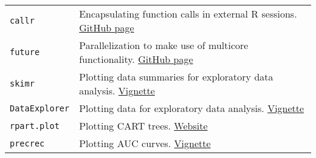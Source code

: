 \documentclass[]{article}
\begin{document}
\begin{longtable}[]{@{}ll@{}}
\begin{minipage}[t]{0.13\columnwidth}\raggedright
\texttt{callr}\strut
\end{minipage} & \begin{minipage}[t]{0.81\columnwidth}\raggedright
Encapsulating function calls in external R sessions.
\href{https://github.com/r-lib/callr\#readme}{GitHub page}\strut
\end{minipage}\tabularnewline
\begin{minipage}[t]{0.13\columnwidth}\raggedright
\texttt{future}\strut
\end{minipage} & \begin{minipage}[t]{0.81\columnwidth}\raggedright
Parallelization to make use of multicore functionality.
\href{https://github.com/HenrikBengtsson/future}{GitHub page}\strut
\end{minipage}\tabularnewline
\begin{minipage}[t]{0.13\columnwidth}\raggedright
\texttt{skimr}\strut
\end{minipage} & \begin{minipage}[t]{0.81\columnwidth}\raggedright
Plotting data summaries for exploratory data analysis.
\href{https://cran.r-project.org/web/packages/skimr/vignettes/Using_skimr.html}{Vignette}\strut
\end{minipage}\tabularnewline
\begin{minipage}[t]{0.13\columnwidth}\raggedright
\texttt{DataExplorer}\strut
\end{minipage} & \begin{minipage}[t]{0.81\columnwidth}\raggedright
Plotting data for exploratory data analysis.
\href{https://cran.r-project.org/web/packages/DataExplorer/vignettes/dataexplorer-intro.html}{Vignette}\strut
\end{minipage}\tabularnewline
\begin{minipage}[t]{0.13\columnwidth}\raggedright
\texttt{rpart.plot}\strut
\end{minipage} & \begin{minipage}[t]{0.81\columnwidth}\raggedright
Plotting CART trees.
\href{http://www.milbo.org/rpart-plot/}{Website}\strut
\end{minipage}\tabularnewline
\begin{minipage}[t]{0.13\columnwidth}\raggedright
\texttt{precrec}\strut
\end{minipage} & \begin{minipage}[t]{0.81\columnwidth}\raggedright
Plotting AUC curves.
\href{https://cran.r-project.org/web/packages/precrec/vignettes/introduction.html}{Vignette}\strut

\end{minipage}
\end{longtable}
\end{document}
